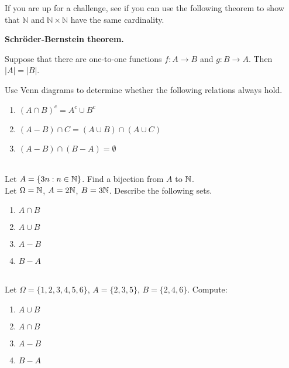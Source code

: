 \begin{appendices}
    If you are up for a challenge, see if you can use the following theorem to show that $\mathbb{N}$ and $\mathbb{N} \times \mathbb{N}$ have the same cardinality.

    \begin{thm} \textbf{Schr\"{o}der-Bernstein theorem.}
    
        Suppose that there are one-to-one functions $f: A \rightarrow B$ and $g: B\rightarrow A$. Then $|A| = |B|$.
    \end{thm}

\thischapterexercises
    \exerciseitem Use Venn diagrams to determine whether the following relations always hold.
          \begin{enumerate}
              \item $(A \cap B)^c = A^c \cup B^c$
              \item $(A - B) \cap C = (A \cup B) \cap (A \cup C)$
              \item $(A - B) \cap (B- A) = \emptyset$
          \end{enumerate}
    \\
    \exerciseitem Let $A = \{3n : n \in \mathbb{N}\}$. Find a bijection from $A$ to $\mathbb{N}$.\\
    
    \exerciseitem Let $\Omega = \mathbb{N}$, $A = 2\mathbb{N}$, $B = 3\mathbb{N}$. Describe the following sets.
    \begin{enumerate}
        \item $A \cap B$
        \item $A \cup B$
        \item $A - B$
        \item $B - A$
    \end{enumerate} \\
    
    \exerciseitem Let $\Omega = \{1,2,3,4,5,6\}$, $A = \{2,3,5\}$, $B = \{2,4,6\}$. Compute:
    \begin{enumerate}
        \item $A \cup B$
        \item $A \cap B$
        \item $A - B$
        \item $B - A$
    \end{enumerate}
\end{appendices}